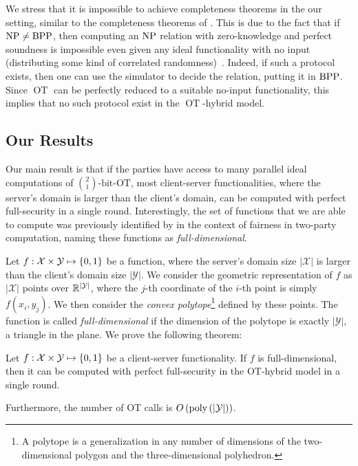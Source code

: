\documentclass{llncs}
\newcommand{\OT}{\operatorname{OT}}
\newcommand{\bOT}[2]{\binom{#2}{#1}\text{-bit-OT}}
\newcommand{\sOT}[3]{\binom{#2}{#1}\text{-}#3\text{-string-OT}}
\newcommand{\X}{\mathcal{X}}
\newcommand{\Y}{\mathcal{Y}}
\begin{document}
We stress that it is impossible to achieve completeness theorems in the our setting, similar to the completeness theorems of \citet{Kilian88}. This is due to the fact that if $\mathrm{NP}\ne\mathrm{BPP}$, then computing an $\mathrm{NP}$ relation with zero-knowledge and perfect soundness is impossible even given any ideal functionality with no input (distributing some kind of correlated randomness)~\cite{IKMOP13}. Indeed, if such a protocol exists, then one can use the simulator to decide the relation, putting it in $\mathrm{BPP}$. Since $\OT$ can be perfectly reduced to a suitable no-input functionality, this implies that no such protocol exist in the $\OT$-hybrid model. 


\subsection{Our Results}\label{sec:results}
Our main result is that if the parties have access to many parallel ideal computations of $\bOT12$, most client-server functionalities, where the server's domain is larger than the client's domain, can be computed with perfect full-security in a single round. Interestingly, the set of functions that we are able to compute was previously identified by \citet{Ash14} in the context of fairness in two-party computation, naming these functions as \emph{full-dimensional}. 

Let $f : \X \times \Y \mapsto \zo$ be a function, where the server's domain size $|\X|$ is larger than the client's domain size $|\Y|$. We consider the geometric representation of $f$ as $|\X|$ points over $\R^{|\Y|}$, where the $j$-th coordinate of the $i$-th
point is simply $f(x_i, y_j)$. We then consider the \emph{convex polytope}\footnote{A polytope is a generalization in any number of dimensions of the two-dimensional polygon and the three-dimensional polyhedron.} defined by these points. The function is called \emph{full-dimensional} if the dimension of the polytope is exactly $|\Y|$, \eg a triangle in the plane.  We prove the following theorem:

\begin{theorem}[Informal]\label{thm:introMain}
	Let $f:\X \times \Y \mapsto \zo$ be a client-server functionality. If $f$ is full-dimensional, then it can be computed with perfect full-security in the OT-hybrid model in a single round. 
    
    Furthermore, the number of OT calls is $O\of{\poly\of{|\Y|}}$.
\end{theorem}
\end{document}
